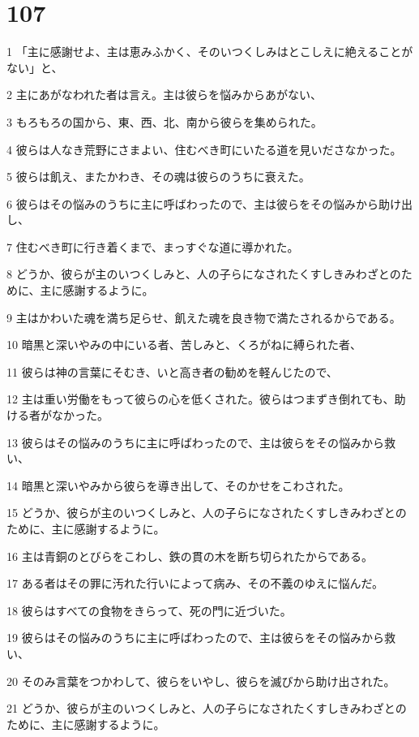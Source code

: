 \chapter{107}

\par 1 「主に感謝せよ、主は恵みふかく、そのいつくしみはとこしえに絶えることがない」と、
\par 2 主にあがなわれた者は言え。主は彼らを悩みからあがない、
\par 3 もろもろの国から、東、西、北、南から彼らを集められた。
\par 4 彼らは人なき荒野にさまよい、住むべき町にいたる道を見いださなかった。
\par 5 彼らは飢え、またかわき、その魂は彼らのうちに衰えた。
\par 6 彼らはその悩みのうちに主に呼ばわったので、主は彼らをその悩みから助け出し、
\par 7 住むべき町に行き着くまで、まっすぐな道に導かれた。
\par 8 どうか、彼らが主のいつくしみと、人の子らになされたくすしきみわざとのために、主に感謝するように。
\par 9 主はかわいた魂を満ち足らせ、飢えた魂を良き物で満たされるからである。
\par 10 暗黒と深いやみの中にいる者、苦しみと、くろがねに縛られた者、
\par 11 彼らは神の言葉にそむき、いと高き者の勧めを軽んじたので、
\par 12 主は重い労働をもって彼らの心を低くされた。彼らはつまずき倒れても、助ける者がなかった。
\par 13 彼らはその悩みのうちに主に呼ばわったので、主は彼らをその悩みから救い、
\par 14 暗黒と深いやみから彼らを導き出して、そのかせをこわされた。
\par 15 どうか、彼らが主のいつくしみと、人の子らになされたくすしきみわざとのために、主に感謝するように。
\par 16 主は青銅のとびらをこわし、鉄の貫の木を断ち切られたからである。
\par 17 ある者はその罪に汚れた行いによって病み、その不義のゆえに悩んだ。
\par 18 彼らはすべての食物をきらって、死の門に近づいた。
\par 19 彼らはその悩みのうちに主に呼ばわったので、主は彼らをその悩みから救い、
\par 20 そのみ言葉をつかわして、彼らをいやし、彼らを滅びから助け出された。
\par 21 どうか、彼らが主のいつくしみと、人の子らになされたくすしきみわざとのために、主に感謝するように。
